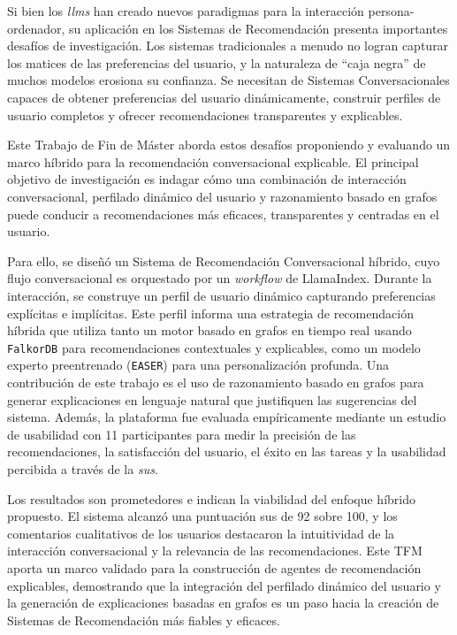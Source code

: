 Si bien los \textit{\acp{llm}} han creado nuevos paradigmas para la interacción persona-ordenador, su aplicación en los Sistemas de Recomendación presenta importantes desafíos de investigación. Los sistemas tradicionales a menudo no logran capturar los matices de las preferencias del usuario, y la naturaleza de ``caja negra'' de muchos modelos erosiona su confianza. Se necesitan de Sistemas Conversacionales capaces de obtener preferencias del usuario dinámicamente, construir perfiles de usuario completos y ofrecer recomendaciones transparentes y explicables.

Este Trabajo de Fin de Máster aborda estos desafíos proponiendo y evaluando un marco híbrido para la recomendación conversacional explicable. El principal objetivo de investigación es indagar cómo una combinación de interacción conversacional, perfilado dinámico del usuario y razonamiento basado en grafos puede conducir a recomendaciones más eficaces, transparentes y centradas en el usuario.

Para ello, se diseñó un Sistema de Recomendación Conversacional híbrido, cuyo flujo conversacional es orquestado por un \textit{workflow} de LlamaIndex. Durante la interacción, se construye un perfil de usuario dinámico capturando preferencias explícitas e implícitas. Este perfil informa una estrategia de recomendación híbrida que utiliza tanto un motor basado en grafos en tiempo real usando \texttt{FalkorDB} para recomendaciones contextuales y explicables, como un modelo experto preentrenado (\texttt{EASER}) para una personalización profunda. Una contribución de este trabajo es el uso de razonamiento basado en grafos para generar explicaciones en lenguaje natural que justifiquen las sugerencias del sistema. Además, la plataforma fue evaluada empíricamente mediante un estudio de usabilidad con 11 participantes para medir la precisión de las recomendaciones, la satisfacción del usuario, el éxito en las tareas y la usabilidad percibida a través de la \textit{\ac{sus}}.

Los resultados son prometedores e indican la viabilidad del enfoque híbrido propuesto. El sistema alcanzó una puntuación \acs{sus} de 92 sobre 100, y los comentarios cualitativos de los usuarios destacaron la intuitividad de la interacción conversacional y la relevancia de las recomendaciones. Este TFM aporta un marco validado para la construcción de agentes de recomendación explicables, demostrando que la integración del perfilado dinámico del usuario y la generación de explicaciones basadas en grafos es un paso hacia la creación de Sistemas de Recomendación más fiables y eficaces.

